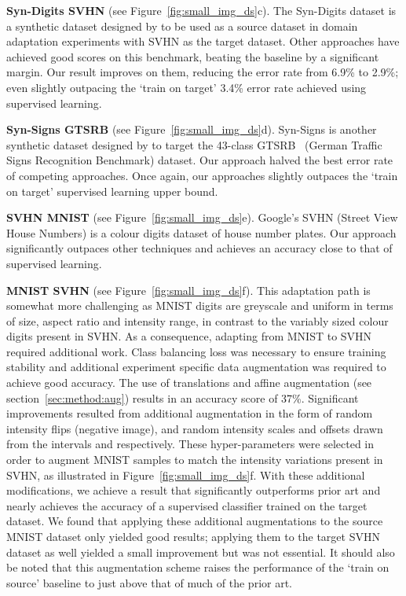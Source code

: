 \documentclass{article}
\begin{document}
\textbf{Syn-Digits  SVHN} (see Figure~\ref{fig:small_img_ds}c). The Syn-Digits dataset is a synthetic dataset designed by \cite{Ganin:DomainAdaptBackprop} to be used as a source dataset in domain adaptation experiments with SVHN as the target dataset. Other approaches have achieved good scores on this benchmark, beating the baseline by a significant margin. Our result improves on them, reducing the error rate from 6.9\% to 2.9\%; even slightly outpacing the `train on target' 3.4\% error rate achieved using supervised learning.


\textbf{Syn-Signs  GTSRB} (see Figure~\ref{fig:small_img_ds}d). Syn-Signs is another synthetic dataset designed by \cite{Ganin:DomainAdaptBackprop} to target the 43-class GTSRB~\cite{Stallkamp:GTSRB} (German Traffic Signs Recognition Benchmark) dataset. Our approach halved the best error rate of competing approaches. Once again, our approaches slightly outpaces the `train on target' supervised learning upper bound.


\textbf{SVHN  MNIST} (see Figure~\ref{fig:small_img_ds}e). Google's SVHN (Street View House Numbers) is a colour digits dataset of house number plates. Our approach significantly outpaces other techniques and achieves an accuracy close to that of supervised learning.


\textbf{MNIST  SVHN} (see Figure~\ref{fig:small_img_ds}f). This adaptation path is somewhat more challenging as MNIST digits are greyscale and uniform in terms of size, aspect ratio and intensity range, in contrast to the variably sized colour digits present in SVHN. As a consequence, adapting from MNIST to SVHN required additional work. Class balancing loss was necessary to ensure training stability and additional experiment specific data augmentation was required to achieve good accuracy.
The use of translations and affine augmentation (see section~\ref{sec:method:aug}) results in an accuracy score of 37\%. Significant improvements resulted from additional augmentation in the form of random intensity flips (negative image), and random intensity scales and offsets drawn from the intervals  and  respectively. These hyper-parameters were selected in order to augment MNIST samples to match the intensity variations present in SVHN, as illustrated in Figure~\ref{fig:small_img_ds}f. With these additional modifications, we achieve a result that significantly outperforms prior art and nearly achieves the accuracy of a supervised classifier trained on the target dataset. We found that applying these additional augmentations to the source MNIST dataset only yielded good results; applying them to the target SVHN dataset as well yielded a small improvement but was not essential. It should also be noted that this augmentation scheme raises the performance of the `train on source' baseline to just above that of much of the prior art.
\end{document}
